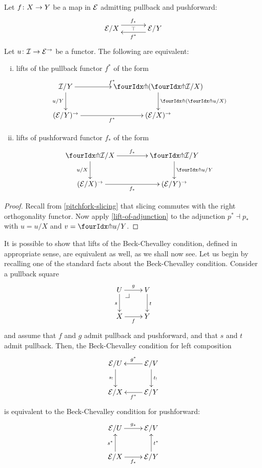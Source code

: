 \documentclass[reqno,10pt,a4paper,oneside]{amsart}
\begin{document}
\begin{proposition}
\label{lift-dependent-product}
Let $f \colon X \to Y$ be a map in $\mathcal{E}$ admitting pullback and pushforward:
\[
\xymatrix@C+1em{
  \catE/X
  \ar@<5pt>[r]^{f_*}
  \ar@{}[r]|{\top}
&
  \catE/Y
  \ar@<5pt>[l]^{f^*}
}
\]
Let $u \colon \mathcal{I} \to \mathcal{E}^{\to}$ be a functor. The following are
equivalent:
\begin{enumerate}[(i)]
\item lifts of the pullback functor $f^*$ of the form
\[
\xymatrix@C=1.5cm{
  \cal{I}/Y
   \ar[r]^{f^*}
  \ar[d]_{u/Y} 
  &
  \liftl{ ( \liftr{\cal{I}}/X ) }
  \ar[d]^{\liftl{(\liftr{u}/X)}}
     \\
     (\catE/Y)^{\to} \ar[r]_{f^*} &
   (\catE/X)^{\to} 
}
\]
\item lifts of pushforward functor $f_*$ of the form
\[
\xymatrix@C=1.5cm{
\liftr{\cal{I}}/X
\ar[r]^{f_*}
  \ar[d]_{u/X}
&
  \liftr{\cal{I}}/Y
  \ar[d]^{\liftr{u}/Y}
\\
  (\catE/X)^{\to}
   \ar[r]_{f_*}
&
  (\catE/Y)^{\to}
 }
\]
\begin{comment}
\item functors $F$ making the following diagram commute:
\[
\xymatrix@C=1.2cm@R=1.5cm{
\liftr{\cal{I}}/X \ar[rr]^F \ar[dr]_{\liftr{u}/X} & &  \liftr{\cal{I}}/ Y \ar[dl]^(.4){\ \liftr{( (u/Y) \cc f^*)}}  \\
 & (\cal{E}/X)^\to & }
\]
\end{comment}
\end{enumerate}
\end{proposition}

\begin{proof}
Recall from \cref{pitchfork-slicing} that slicing commutes with the right orthogonality functor.
Now apply \cref{lift-of-adjunction} to the adjunction $p^* \dashv p_*$ with $u = u/X$ and $v = \liftr{u}/Y$.
\end{proof}

It is possible to show that lifts of the Beck-Chevalley condition, defined in appropriate sense, are equivalent as well, as we shall now see. Let us begin by recalling one of the standard facts about the Beck-Chevalley condition. Consider a
pullback square 
\[
\xymatrix{
  U
  \ar[d]_{s}
  \ar[r]^{g}
  \pullback{dr}
&
  V
  \ar[d]^{t}
\\
  X
  \ar[r]_{f}
&
  Y
}
\]
and assume that $f$ and $g$ admit pullback and pushforward, and that $s$ and $t$ admit pullback. Then,
 the Beck-Chevalley condition for left composition
\[
\xymatrix{
  \catE/U
  \ar[d]_{s_!}
&
  \catE/V
  \ar[l]_{g^*}
  \ar[d]^{t_!}
\\
  \catE/X
&
  \catE/Y
  \ar[l]^{f^*}
}
\]
is equivalent to the Beck-Chevalley condition for pushforward:
\[
\xymatrix{
  \catE/U
  \ar[r]^{g_*}
&
  \catE/V
\\
  \catE/X
  \ar[r]_{f_*}
  \ar[u]^{s^*}
&
  \catE/Y
  \ar[u]_{t^*}
}
\]
\end{document}
